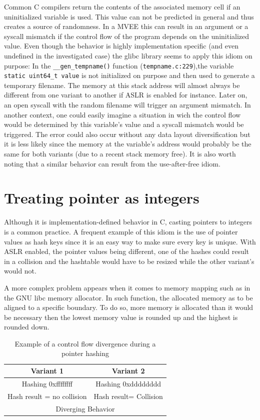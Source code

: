 \documentclass[english]{enstaPRE}
\begin{document}
Common C compilers return the contents of the associated memory cell if an uninitialized variable is used.
This value can not be predicted in general and thus creates a source of randomness. In a MVEE this can result in an argument or a syscall mismatch if the
control flow of the program depends on the uninitialized value.
Even though the behavior is highly implementation specific (and even undefined in the investigated case) the glibc library seems to apply 
this idiom on purpose: In the \texttt{\_\_gen\_tempname()} function (\texttt{tempname.c:229}),the variable \texttt{static uint64\_t value}
is not initialized on purpose and then used to generate a temporary filename.
The memory at this stack address will almost always be different from one variant to another if ASLR is enabled for instance.
Later on, an open syscall with the random filename will trigger an argument mismatch. In another context, one could easily imagine
a situation in wich the control flow would be determined by this variable’s value and a syscall mismatch would be triggered.
The error could also occur without any data layout diversification but it is less likely since the memory at the variable’s address would
probably be the same for both variants (due to a recent stack memory free).
It is also worth noting that a similar behavior can result from the use-after-free idiom. \\


\section{Treating pointer as integers}

Although it is implementation-defined behavior in C, casting pointers to integers is a common practice.
A frequent example of this idiom is the use of pointer values as hash keys since it is an easy way to make sure every key is unique. With ASLR enabled,
the pointer values being different, one of the hashes could result in a collision and the hashtable would have to be resized while
the other variant’s would not.

A more complex problem appears when it comes to memory mapping such as in the GNU libc memory allocator.
In such function, the allocated memory as to be aligned to a specific boundary. To do so, more memory is allocated than it would be 
necessary then the lowest memory value is rounded up and the highest is rounded down. \\

\begin{table}[t]
 \centering
 \def\arraystretch{1.5}
 \begin{tabular}{c|c}
 Variant 1 & Variant 2 \\\hline
 Hashing 0xffffffff &  Hashing 0xdddddddd \\
 Hash result = no collision & Hash result= Collision \\
  \multicolumn{2}{c}{Diverging Behavior}\\
\end{tabular}
\caption{Example of a control flow divergence during a pointer hashing}
\label{tab:hashdiv}
\end{table}
\end{document}
